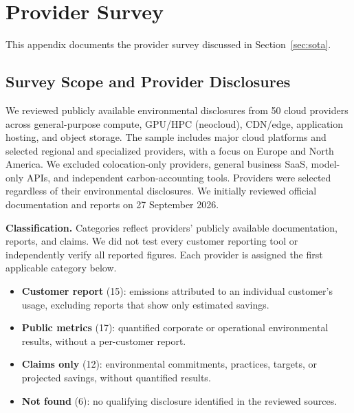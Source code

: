 \begingroup
{}
\newcommand{\surveyclass}[2]{\textcolor{#1}{\textbf{#2}}}
\newcommand{\surveysource}[2]{#2~\cite{#1}}
\color{black}
\hypersetup{urlcolor=black,linkcolor=black,citecolor=black}
\newcommand{\surveygroup}[1]{\colorbox{surveyHeading!10}{\parbox{\dimexpr\textwidth-2\fboxsep\relax}{\textcolor{surveyHeading}{\strut\textbf{#1}}}}}
\section{Provider Survey}
\label{app:provider-survey}
This appendix documents the provider survey discussed in Section~\ref{sec:sota}.

\subsection{Survey Scope and Provider Disclosures}
\label{app:inventory}
We reviewed publicly available environmental disclosures from 50 cloud providers across general-purpose compute, GPU/HPC (neocloud), CDN/edge, application hosting, and object storage.
The sample includes major cloud platforms and selected regional and specialized providers, with a focus on Europe and North America.
We excluded colocation-only providers, general business SaaS, model-only APIs, and independent carbon-accounting tools.
Providers were selected regardless of their environmental disclosures.
We initially reviewed official documentation and reports on 27 September 2026.

\smallskip
\noindent\textbf{Classification.} Categories reflect providers' publicly available documentation, reports, and claims.
We did not test every customer reporting tool or independently verify all reported figures.
Each provider is assigned the first applicable category below.
\begin{itemize}
\setlength{\itemsep}{1pt}
\setlength{\parskip}{0pt}
\item \textcolor{surveyReport}{\textbf{Customer report}} (15): emissions attributed to an individual customer's usage, excluding reports that show only estimated savings.
\item \textcolor{surveyMetrics}{\textbf{Public metrics}} (17): quantified corporate or operational environmental results, without a per-customer report.
\item \textcolor{surveyClaims}{\textbf{Claims only}} (12): environmental commitments, practices, targets, or projected savings, without quantified results.
\item \textcolor{surveyMissing}{\textbf{Not found}} (6): no qualifying disclosure identified in the reviewed sources.
\end{itemize}

